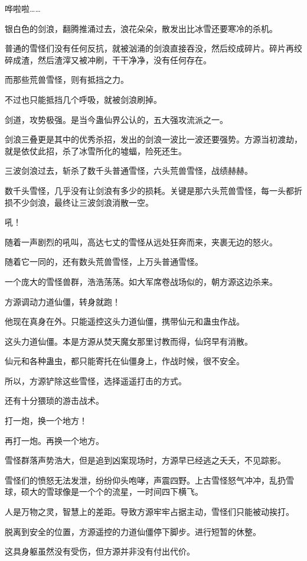 \begin{this_body}
哗啦啦……

银白色的剑浪，翻腾推涌过去，浪花朵朵，散发出比冰雪还要寒冷的杀机。

普通的雪怪们没有任何反抗，就被汹涌的剑浪直接吞没，然后绞成碎片。碎片再绞碎成渣，然后渣滓又被冲刷，干干净净，没有任何存在。

而那些荒兽雪怪，则有抵挡之力。

不过也只能抵挡几个呼吸，就被剑浪刷掉。

剑道，攻势极强。是当今蛊仙界公认的，五大强攻流派之一。

剑浪三叠更是其中的优秀杀招，发出的剑浪一波比一波还要强势。方源当初渡劫，就是依仗此招，杀了冰雪所化的墟蝠，险死还生。

三波剑浪过去，斩杀了数千头普通雪怪，六头荒兽雪怪，战绩赫赫。

数千头雪怪，几乎没有让剑浪有多少的损耗。关键是那六头荒兽雪怪，每一头都折损不少剑浪，最终让三波剑浪消散一空。

吼！

随着一声剧烈的吼叫，高达七丈的雪怪从远处狂奔而来，夹裹无边的怒火。

随着它一同的，还有数头荒兽雪怪，上万头普通雪怪。

一个庞大的雪怪兽群，浩浩荡荡。如大军席卷战场似的，朝方源这边杀来。

方源调动力道仙僵，转身就跑！

他现在真身在外。只能遥控这头力道仙僵，携带仙元和蛊虫作战。

这头力道仙僵。本是方源从焚天魔女那里讨教而得，仙窍早有消散。

仙元和各种蛊虫，都只能寄托在仙僵身上，作战时候，很不安全。

所以，方源铲除这些雪怪，选择遥遥打击的方式。

还有十分猥琐的游击战术。

打一炮，换一个地方！

再打一炮。再换一个地方。

雪怪群落声势浩大，但是追到凶案现场时，方源早已经逃之夭夭，不见踪影。

雪怪们的愤怒无法发泄，纷纷仰头咆哮，声震四野。上古雪怪怒气冲冲，乱扔雪球，硕大的雪球像是一个个的流星，一时间四下横飞。

人是万物之灵，智慧上的差距。导致方源牢牢占据主动，雪怪们只能被动挨打。

脱离到安全的位置，方源遥控的力道仙僵停下脚步。进行短暂的休整。

这具身躯虽然没有受伤，但方源并非没有付出代价。


\end{this_body}
